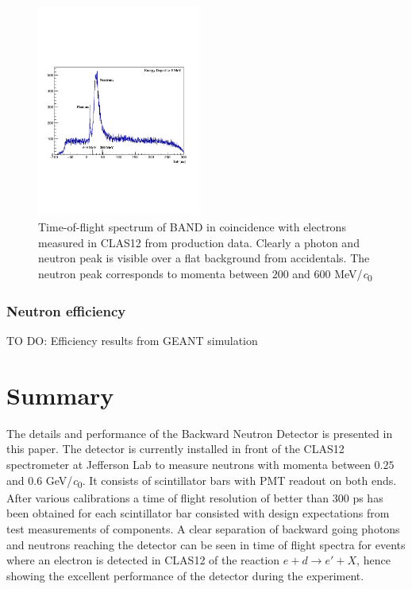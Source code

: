 \documentclass[3p,final,twocolumn]{elsarticle}
\begin{document}
\begin{figure}[h!]
	\centering
		\includegraphics[width=0.48\textwidth]{tof-labels.pdf}
	\caption{Time-of-flight spectrum of BAND in coincidence with electrons measured in CLAS12 from production data. Clearly a photon and neutron peak is visible over a flat background from accidentals. The neutron peak corresponds to momenta  between $200$ and $600$ \si{\MeV/\clight}}
	\label{fig:tof}
\end{figure}


\subsubsection{Neutron efficiency}
TO DO: Efficiency results from GEANT simulation




\section{Summary}
The details and performance of the Backward Neutron Detector is presented in this paper. The detector is currently installed in front of the CLAS12 spectrometer at Jefferson Lab to measure neutrons with momenta between $0.25$ and $0.6$ \si{\GeV/\clight}.  It consists of scintillator bars with PMT readout on both ends.
After various calibrations a time of flight resolution of better than 300 \si{\pico\s} has been obtained for each scintillator bar consisted with design expectations from test measurements of components. A clear separation of backward going photons and neutrons reaching the detector can be seen in time of flight spectra for events where an electron is detected in CLAS12 of the reaction $e+d \rightarrow e'+X$, hence showing the excellent performance of the detector during the experiment.
\end{document}

